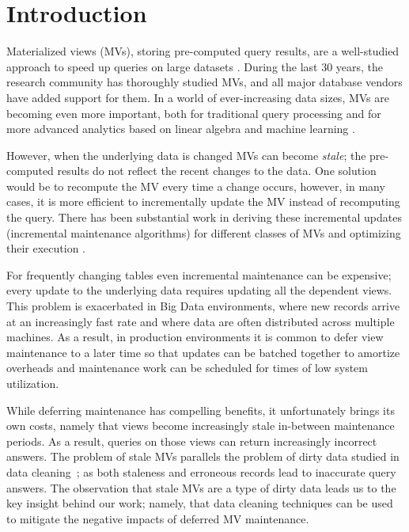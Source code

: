\vspace{-0.5em}
\section{Introduction}
Materialized views (MVs), storing pre-computed query results, are a well-studied approach to speed up queries on large datasets \cite{LarsonY85, gupta1995maintenance, chirkova2011materialized, halevy2001answering}.
During the last 30 years, the research community has thoroughly studied MVs, and all major database vendors have added support for them.
In a world of ever-increasing data sizes, MVs are becoming even more important, both for traditional query processing
 \cite{lefevre2014opportunistic, bailis2014scalable, perez2014history} and for more advanced analytics based on linear algebra and machine learning \cite{nikolic2014linview, zhang2014mat}.

However, when the underlying data is changed MVs can become \emph{stale}; the pre-computed results do not reflect the recent changes to the data. 
One solution would be to recompute the MV every time a change occurs, however, in many cases, it is more efficient to incrementally update the MV instead of recomputing the query.
There has been substantial work in deriving these incremental updates (incremental maintenance algorithms) for different classes of MVs and optimizing their execution \cite{gupta1995maintenance, DBLP:conf/sigmod/GriffinL95, griffin1997improved, samtani1999self, DBLP:conf/sac/TrutaC07, DBLP:journals/vldb/KochAKNNLS14, chirkova2011materialized}.

For frequently changing tables even incremental maintenance can be expensive; every update to the underlying data requires updating all the dependent views.  
This problem is exacerbated in Big Data environments, where new records arrive at an increasingly fast rate and where data are often 
distributed across multiple machines.  
As a result, in production environments it is common to defer view maintenance to a later time \cite{chirkova2011materialized, zhou2007lazy, DBLP:conf/sigmod/ColbyGLMT96} so that updates can be batched together to amortize overheads and maintenance work can be scheduled for times of low system utilization.  

While deferring maintenance has compelling benefits, it unfortunately brings its own costs, namely that views become increasingly stale in-between maintenance periods. As a result, queries on those views can return increasingly incorrect answers.
The problem of stale MVs parallels the problem of dirty data studied in data cleaning~\cite{rahm2000data}; as both staleness and erroneous records lead to inaccurate query answers.
The observation that stale MVs are a type of dirty data leads us to the key insight behind our work; namely, that data cleaning techniques can be used to mitigate the negative impacts
of deferred MV maintenance.

